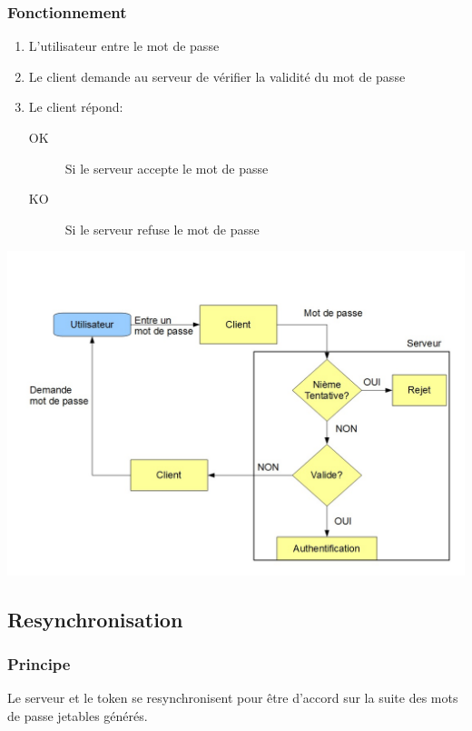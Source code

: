 \documentclass{"../../res/univ-projet"}
\begin{document}
\subsubsection{Fonctionnement}
\begin{enumerate}
    \item L'utilisateur entre le mot de passe
    \item Le client demande au serveur de vérifier la validité du
        mot de passe
    \item Le client répond:
        \begin{description}
            \item[OK] Si le serveur accepte le mot de passe
            \item[KO] Si le serveur refuse le mot de passe
        \end{description}
\end{enumerate}
\includegraphics[width=\textwidth]{../graphics/authentification.jpg}

\subsection{Resynchronisation}
\subsubsection{Principe}
Le serveur et le token se resynchronisent pour être d'accord sur la suite des
mots de passe jetables générés.
\end{document}
